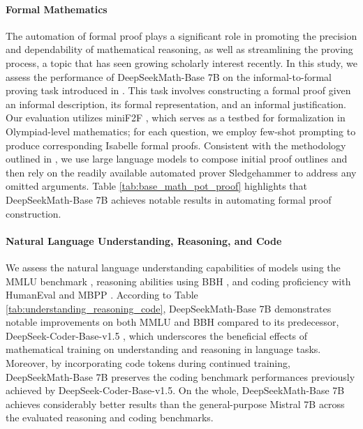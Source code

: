 \begin{itemize}[topsep=0pt]
\paragraph{Formal Mathematics}

The automation of formal proof plays a significant role in promoting the precision and dependability of mathematical reasoning, as well as streamlining the proving process, a topic that has seen growing scholarly interest recently. In this study, we assess the performance of DeepSeekMath-Base 7B on the informal-to-formal proving task introduced in \citep{dsp_proof}. This task involves constructing a formal proof given an informal description, its formal representation, and an informal justification. Our evaluation utilizes miniF2F \citep{minif2f}, which serves as a testbed for formalization in Olympiad-level mathematics; for each question, we employ few-shot prompting to produce corresponding Isabelle formal proofs. Consistent with the methodology outlined in \cite{dsp_proof}, we use large language models to compose initial proof outlines and then rely on the readily available automated prover Sledgehammer \citep{sledgehammer} to address any omitted arguments. Table \ref{tab:base_math_pot_proof} highlights that DeepSeekMath-Base 7B achieves notable results in automating formal proof construction.

\paragraph{Natural Language Understanding, Reasoning, and Code}

We assess the natural language understanding capabilities of models using the MMLU benchmark \citep{mmlu}, reasoning abilities using BBH \citep{bbh}, and coding proficiency with HumanEval \citep{codex} and MBPP \citep{mbpp}. According to Table \ref{tab:understanding_reasoning_code}, DeepSeekMath-Base 7B demonstrates notable improvements on both MMLU and BBH compared to its predecessor, DeepSeek-Coder-Base-v1.5 \citep{deepseek-coder}, which underscores the beneficial effects of mathematical training on understanding and reasoning in language tasks. Moreover, by incorporating code tokens during continued training, DeepSeekMath-Base 7B preserves the coding benchmark performances previously achieved by DeepSeek-Coder-Base-v1.5. On the whole, DeepSeekMath-Base 7B achieves considerably better results than the general-purpose Mistral 7B \citep{mistral} across the evaluated reasoning and coding benchmarks.


\end{itemize}
